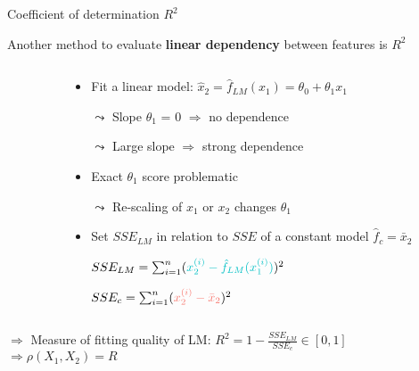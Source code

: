 \documentclass[11pt,compress,t,notes=noshow, aspectratio=169, xcolor=table]{beamer}
\begin{document}
\begin{frame}{Coefficient of determination $R^2$}

Another method to evaluate \textbf{linear dependency} between features is $R^2$

\begin{columns}[c, totalwidth=\textwidth]
\begin{column}{0.52\linewidth}
\end{column}
\begin{column}{0.48\linewidth}

\medskip

\begin{itemize}
    \setlength\itemsep{0.7mm}
    \item Fit a linear model:
    $\hat{x}_2 = \hat{f}_{LM}(x_1) = \theta_0 + \theta_1 x_1$
    \item[$\leadsto$] Slope $\theta_1$ = $0$ $\Rightarrow$ no dependence
    \item[$\leadsto$] Large slope $\Rightarrow$ strong dependence
        \pause
    \item Exact $\theta_1$ score problematic 
    \item[$\leadsto$] Re-scaling of $x_1$ or $x_2$ changes $\theta_1$ 
    \pause
    \item Set $SSE_{LM}$ in relation to $SSE$ of a constant model $\hat{f}_c = \bar{x}_2$
    \item[] $SSE_{LM} = \sum_{i=1}^n ({\color{ggblue}x_2^{(i)} - \hat{f}_{LM}(x_1^{(i)})})^2$
    \item[] $SSE_{c} = \sum_{i=1}^n ({\color{ggred}x_2^{(i)} - \bar{x}_2})^2$
\end{itemize}

\end{column}
\end{columns}

\medskip

$\Rightarrow$ Measure of fitting quality of LM: $R^2 = 1-\frac{SSE_{LM}}{SSE_{c}} \in [0, 1]$ \\
$\Rightarrow \rho(X_1, X_2) = R$

\end{frame}
\end{document}
